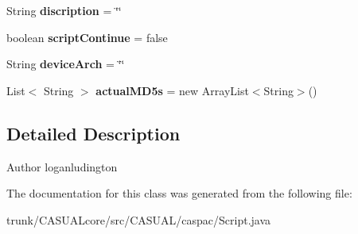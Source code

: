 \begin{DoxyCompactItemize}
\item 
\hypertarget{classCASUAL_1_1caspac_1_1Script_a2b24af13e5afbabd652d64c2a08779d5}{String {\bfseries discription} = \char`\"{}\char`\"{}}\label{classCASUAL_1_1caspac_1_1Script_a2b24af13e5afbabd652d64c2a08779d5}

\item 
\hypertarget{classCASUAL_1_1caspac_1_1Script_a344e4879129271e1b09cfec4809bcf38}{boolean {\bfseries script\-Continue} = false}\label{classCASUAL_1_1caspac_1_1Script_a344e4879129271e1b09cfec4809bcf38}

\item 
\hypertarget{classCASUAL_1_1caspac_1_1Script_ab8ee92ff986a2a9a657b97813b7ee81b}{String {\bfseries device\-Arch} = \char`\"{}\char`\"{}}\label{classCASUAL_1_1caspac_1_1Script_ab8ee92ff986a2a9a657b97813b7ee81b}

\item 
\hypertarget{classCASUAL_1_1caspac_1_1Script_a80069c0eebba9d3ee738e1b2332aeabc}{List$<$ String $>$ {\bfseries actual\-M\-D5s} = new Array\-List$<$String$>$()}\label{classCASUAL_1_1caspac_1_1Script_a80069c0eebba9d3ee738e1b2332aeabc}

\end{DoxyCompactItemize}


\subsection{Detailed Description}
\begin{DoxyAuthor}{Author}
loganludington 
\end{DoxyAuthor}


The documentation for this class was generated from the following file\-:\begin{DoxyCompactItemize}
\item 
trunk/\-C\-A\-S\-U\-A\-Lcore/src/\-C\-A\-S\-U\-A\-L/caspac/Script.\-java\end{DoxyCompactItemize}
